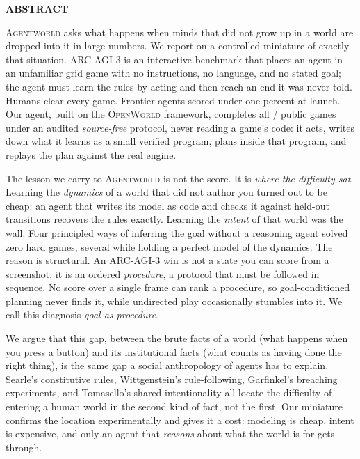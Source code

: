 \documentclass[11pt]{article}
\newcommand{\openworld}{\textsc{OpenWorld}}
\newcommand{\agentworld}{\textsc{Agentworld}}
\newcommand{\gap}{\emph{goal-as-procedure}}
\begin{document}
\vspace{0.6em}
\begin{tcolorbox}[breakable, enhanced, colback=white, colframe=black!12,
  arc=3pt, boxrule=0.5pt, left=18pt, right=16pt, top=5pt, bottom=5pt,
  borderline west={3pt}{0pt}{cardblue}, drop fuzzy shadow=black!18]
\setlength{\parskip}{0pt}
{\sffamily\bfseries\color{cardblue} ABSTRACT}\par
\vspace{3pt}
\agentworld{} asks what happens when minds that did not grow up in a world are dropped into it in
large numbers. We report on a controlled miniature of exactly that situation. ARC-AGI-3 is an
interactive benchmark that places an agent in an unfamiliar grid game with no instructions, no
language, and no stated goal; the agent must learn the rules by acting and then reach an end it was
never told. Humans clear every game. Frontier agents scored under one percent at launch. Our agent,
built on the \openworld{} framework, completes all \ArcFableFull/\ArcUnionGames{} public games under an
audited \emph{source-free} protocol, never reading a game's code: it acts, writes down what it learns as
a small verified program, plans inside that program, and replays the plan against the real engine.

The lesson we carry to \agentworld{} is not the score. It is \emph{where the difficulty sat}. Learning
the \emph{dynamics} of a world that did not author you turned out to be cheap: an agent that writes
its model as code and checks it against held-out transitions recovers the rules exactly. Learning the
\emph{intent} of that world was the wall. Four principled ways of inferring the goal without a reasoning
agent solved zero hard games, several while holding a perfect model of the dynamics. The reason is
structural. An ARC-AGI-3 win is not a state you can score from a screenshot; it is an ordered
\emph{procedure}, a protocol that must be followed in sequence. No score over a single frame can rank
a procedure, so goal-conditioned planning never finds it, while undirected play occasionally stumbles
into it. We call this diagnosis \gap{}.

We argue that this gap, between the brute facts of a world (what happens when you press a button) and its
institutional facts (what counts as having done the right thing), is the same gap a social anthropology of
agents has to explain. Searle's constitutive rules, Wittgenstein's rule-following, Garfinkel's breaching
experiments, and Tomasello's shared intentionality all locate the difficulty of entering a human world in
the second kind of fact, not the first. Our miniature confirms the location experimentally and gives it a
cost: modeling is cheap, intent is expensive, and only an agent that \emph{reasons} about what the world
is for gets through.


\end{tcolorbox}
\end{document}

